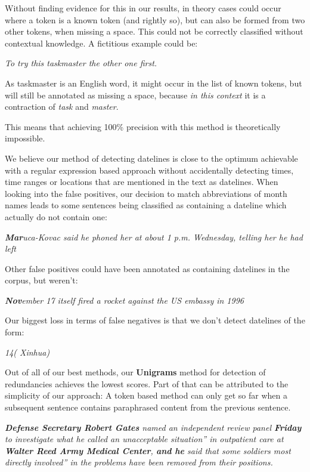 \documentclass[a4paper,10pt]{scrartcl}
\theoremstyle{style}
\begin{document}
Without finding evidence for this in our results, in theory cases could occur where a token is a known token (and rightly so), but can also be formed from two other tokens, when missing a space. This could not be correctly classified without contextual knowledge. A fictitious example could be:

\quad\textit{To try this taskmaster the other one first.}

As taskmaster is an English word, it might occur in the list of known tokens, but will still be annotated as missing a space, because \textit{in this context} it is a contraction of \textit{task} and \textit{master}.

This means that achieving 100\% precision with this method is theoretically impossible.

We believe our method of detecting datelines is close to the optimum achievable with a regular expression based approach without accidentally detecting times, time ranges or locations that are mentioned in the text as datelines.
When looking into the false positives, our decision to match abbreviations of month names leads to some sentences being classified as containing a dateline which actually do not contain one:

\quad\textit{\textbf{Mar}uca-Kovac said he phoned her at about 1 p.m. Wednesday, telling her he had left}

Other false positives could have been annotated as containing datelines in the corpus, but weren't:

\quad\textit{\textbf{Nov}ember 17 itself fired a rocket against the US embassy in 1996}

Our biggest loss in terms of false negatives is that we don't detect datelines of the form:

\quad\textit{14( Xinhua)}

Out of all of our best methods, our \textbf{Unigrams} method for detection of redundancies achieves the lowest scores. Part of that can be attributed to the simplicity of our approach: A token based method can only get so far when a subsequent sentence contains paraphrased content from the previous sentence.

\quad\textit{\textbf{Defense Secretary Robert Gates} named an independent review panel \textbf{Friday} to investigate what he called an unacceptable situation'' in outpatient care at \textbf{Walter Reed Army Medical Center}, \textbf{and he} said that some soldiers most directly involved'' in the problems have been removed from their positions.}
\end{document}
